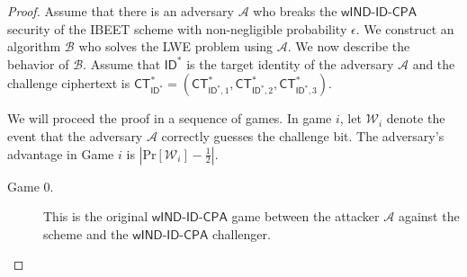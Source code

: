 \documentclass[runningheads]{llncs}
\def\cal{\mathcal}
\def\CT{\mathsf{CT}}
\def\Pr{\mathrm{Pr}}
\def\wIND{\textsf{wIND-ID-CPA}}
\def\ID{\mathsf{ID}}
\def\W{\cal{W}}
\begin{document}
\begin{proof}
	Assume that there is an adversary $\cal{A}$ who breaks the $\wIND$ security of the IBEET scheme with non-negligible probability $\epsilon$. We construct an algorithm $\cal{B}$ who solves the LWE problem using $\cal{A}$. We now describe the behavior of $\cal{B}$. Assume that $\ID^*$ is the target identity of the adversary $\cal{A}$ and the challenge ciphertext is
$\CT_{\ID^*}^*=(\CT_{\ID^*,1}^*,\CT_{\ID^*,2}^*,\CT_{\ID^*,3}^*)$.

We will proceed the proof in a sequence of games. In game $i$, let $\W_i$ denote the event that the adversary $\cal{A}$ correctly guesses the challenge bit. The adversary's advantage in Game $i$ is $\left|\Pr[\W_i]-\frac{1}{2}\right|$.
\begin{description}
\item[Game 0.] This is the original $\wIND$ game between the attacker $\cal{A}$ against the scheme and the $\wIND$ challenger.



\end{description}
\end{proof}
\end{document}
